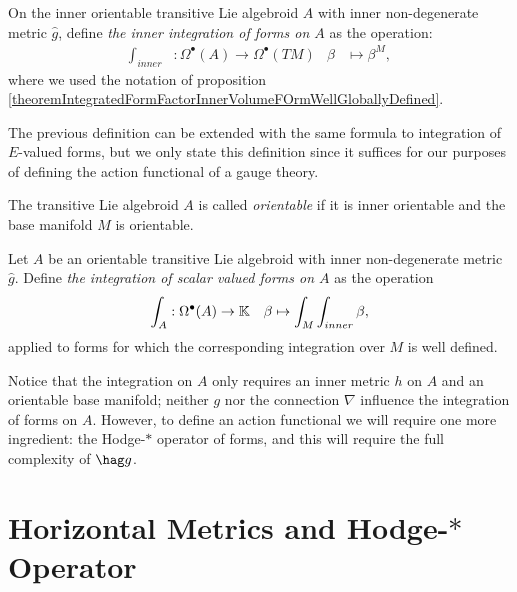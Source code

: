 \begin{definition}
On the inner orientable transitive Lie algebroid $A$ with inner non-degenerate metric $\hat g$, define \emph{the inner integration of forms on $A$} as the operation:
\begin{align}
    \int_{inner} &: \Omega^\bullet(A) \to \Omega^\bullet(TM)
    & \beta &\mapsto \beta^M,
\end{align}
where we used the notation of proposition \ref{theoremIntegratedFormFactorInnerVolumeFOrmWellGloballyDefined}.
\end{definition}
The previous definition can be extended with the same formula to integration of $E$-valued forms, but we only state this definition since it suffices for our purposes of defining the action functional of a gauge theory.

\linea

\begin{definition}
The transitive Lie algebroid $A$ is called \emph{orientable} if it is inner orientable and the base manifold $M$ is orientable.
\end{definition}

\begin{definition}
Let $A$ be an orientable transitive Lie algebroid with inner non-degenerate metric $\hat g$. Define \emph{the integration of scalar valued forms on $A$} as the operation
\begin{align}
    \int_A: \Omega^\bullet(A) &\to \mathbb{K}
    & \beta \mapsto \int_M \int_{inner} \beta,
\end{align}
applied to forms for which the corresponding integration over $M$ is well defined.
\end{definition}

\begin{remark}
Notice that the integration on $A$ only requires an inner metric $h$ on $A$ and an orientable base manifold; neither $g$ nor the connection $\nabla$ influence the integration of forms on $A$. However, to define an action functional we will require one more ingredient: the Hodge-$*$ operator of forms, and this will require the full complexity of $\hag g$.
\end{remark}


\section{Horizontal Metrics and Hodge-$*$ Operator}
